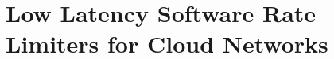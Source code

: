 
\chapter{Low Latency Software Rate Limiters for Cloud Networks}
\label{thesis:chapter:rate_limiter}








